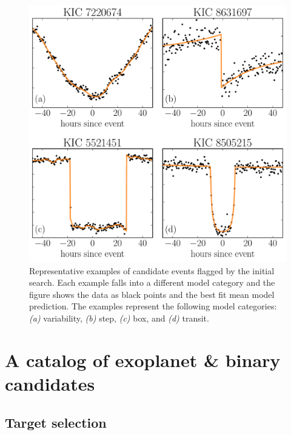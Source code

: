 \documentclass[twocolumn]{aastex6}
\newcommand{\figlabel}[1]{\label{fig:#1}}
\newcommand{\sectlabel}[1]{\label{sect:#1}}
\begin{document}
\begin{figure}
\begin{center}
\includegraphics[width=\textwidth]{figures/model_comp.pdf}
\end{center}
\caption{%
Representative examples of candidate events flagged by the initial search.
Each example falls into a different model category and the figure shows the
data as black points and the best fit mean model prediction.
The examples represent the following model categories:
\emph{(a)} variability, \emph{(b)} step, \emph{(c)} box, and \emph{(d)}
transit.
\figlabel{model-comp}}
\end{figure}


\section{A catalog of exoplanet \& binary candidates}


\subsection{Target selection}\sectlabel{data}
\end{document}
